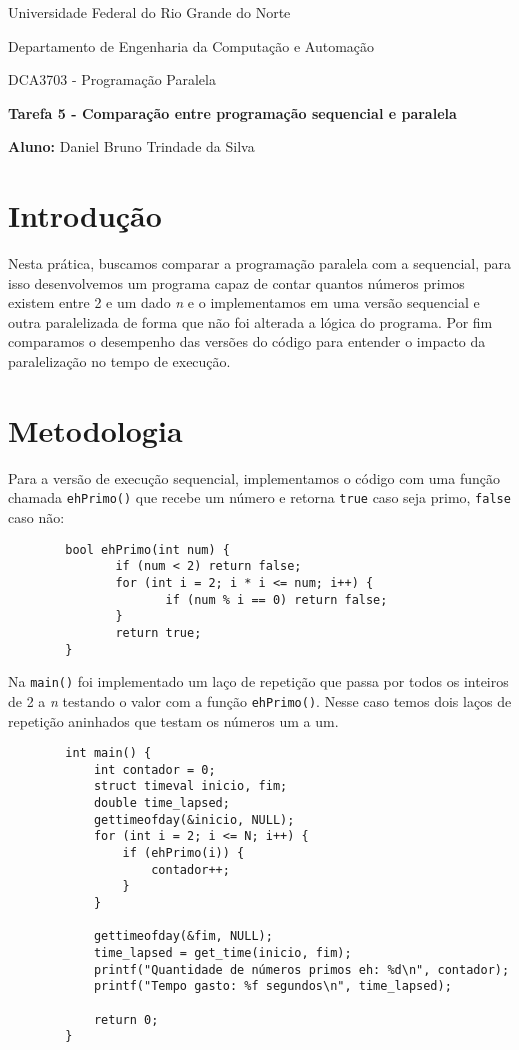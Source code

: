 \documentclass[a4paper, 12pt]{article}
\begin{document}
	\begin{center}
		Universidade Federal do Rio Grande do Norte
		
		Departamento de Engenharia da Computação e Automação
		
		DCA3703 - Programação Paralela
		
		\textbf{Tarefa 5 - Comparação entre programação sequencial e paralela}
		
		\textbf{Aluno:} Daniel Bruno Trindade da Silva
	\end{center}
	
	\section{Introdução}
	\hspace{.7cm}Nesta prática, buscamos comparar a programação paralela com a sequencial, para isso desenvolvemos um programa capaz de contar quantos números primos existem entre 2 e um dado \textit{n} e o implementamos em uma versão sequencial e outra paralelizada de forma que não foi alterada a lógica do programa. Por fim comparamos o desempenho das versões do código para entender o impacto da paralelização no tempo de execução.
	
	\section{Metodologia}
	\hspace{.7cm}Para a versão de execução sequencial, implementamos o código com uma  função chamada \texttt{ehPrimo()} que recebe um número e retorna \texttt{true} caso seja primo, \texttt{false} caso não:
	
	\begin{verbatim}
		bool ehPrimo(int num) {
			   if (num < 2) return false;
			   for (int i = 2; i * i <= num; i++) {
				      if (num % i == 0) return false;
			   }
			   return true;
		}
	\end{verbatim}
	
	Na \texttt{main()} foi implementado um laço de repetição que passa por todos os inteiros de 2 a \textit{n} testando o valor com a função \texttt{ehPrimo()}. Nesse caso temos dois laços de repetição aninhados que testam os números um a um.
	
	\begin{verbatim}
		int main() {
		    int contador = 0;
		    struct timeval inicio, fim;
		    double time_lapsed;
		    gettimeofday(&inicio, NULL);
		    for (int i = 2; i <= N; i++) {
		        if (ehPrimo(i)) {
		            contador++;
		        }
		    }
		    
		    gettimeofday(&fim, NULL); 
		    time_lapsed = get_time(inicio, fim);
		    printf("Quantidade de números primos eh: %d\n", contador);
		    printf("Tempo gasto: %f segundos\n", time_lapsed);
		    
		    return 0;
		}
	\end{verbatim}
	
\end{document}
